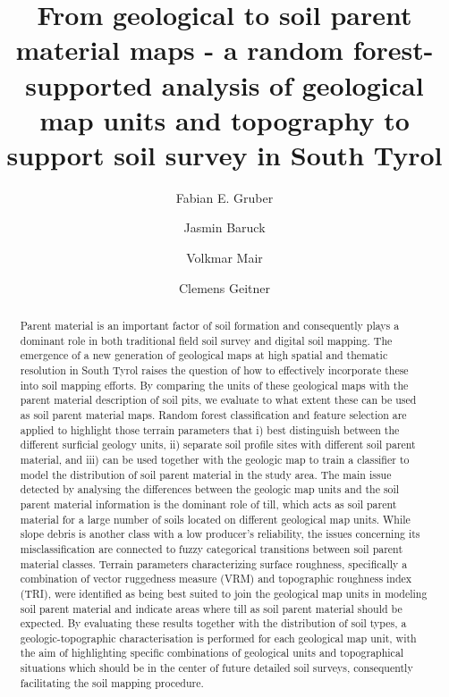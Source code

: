 \documentclass[preprint,12pt,authoryear]{elsarticle}
\begin{document}
\begin{frontmatter}

\title{From geological to soil parent material maps - a random forest-supported  analysis of geological map units and topography to support soil survey in South Tyrol}



\author[mymainadress,mynewadress]{Fabian E. Gruber}
\author[mymainadress]{Jasmin Baruck}
\author[secondadress]{Volkmar Mair}
\author[mymainadress]{Clemens Geitner}



\address[mymainadress]{Institute of Geography, University of Innsbruck, Innrain 52f, 6020 Innsbruck, Austria}
\address[secondadress]{Office for Geology and building materials testing, Eggentaler Stra{\ss}e 48, 39053 Kardaun, Autonomous Province Bolzano -- South Tyrol, Italy}
\address[mynewadress]{Austrian Agency for Health and Food Safety, Spargelfeldstra{\ss}e 191, 1220 Vienna, Innsbruck}
\begin{abstract}
Parent material is an important factor of soil formation and consequently plays a dominant role in both traditional field soil survey and digital soil mapping. The emergence of a new generation of geological maps at high spatial and thematic resolution in South Tyrol raises the question of how to effectively incorporate these into soil mapping efforts. By comparing the units of these geological maps with the parent material description of soil pits, we evaluate to what extent these can be used as soil parent material maps. Random forest classification and feature selection are applied to highlight those terrain parameters that i) best distinguish between the different surficial geology units, ii) separate soil profile sites with different soil parent material, and iii) can be used together with the geologic map to train a classifier to model the distribution of soil parent material in the study area. The main issue detected by analysing the differences between the geologic map units and the soil parent material information is the dominant role of till, which acts as soil parent material for a large number of soils located on different geological map units. While slope debris is another class with a low producer's reliability, the issues concerning its misclassification are connected to fuzzy categorical transitions between soil parent material classes.  Terrain parameters characterizing surface roughness, specifically a combination of vector ruggedness measure (VRM) and topographic roughness index (TRI), were identified as being best suited to join the geological map units in modeling soil parent material and indicate areas where till as soil parent material should be expected.
By evaluating these results together with the distribution of soil types, a geologic-topographic characterisation is performed for each geological map unit, with the aim of highlighting specific combinations of geological units and topographical situations which should be in  the center of future detailed soil surveys, consequently facilitating the soil mapping procedure.
\end{abstract}


\end{frontmatter}
\end{document}
